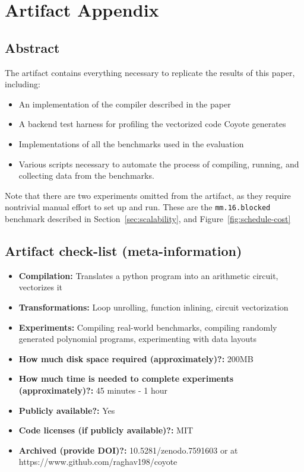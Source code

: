 \section{Artifact Appendix}

\subsection{Abstract}

The artifact contains everything necessary to replicate the results of this paper, including:
\begin{itemize}
    \item An implementation of the compiler described in the paper
    \item A backend test harness for profiling the vectorized code Coyote generates
    \item Implementations of all the benchmarks used in the evaluation
    \item Various scripts necessary to automate the process of compiling, running, and collecting data from the benchmarks.
\end{itemize}

Note that there are two experiments omitted from the artifact, as they require nontrivial manual effort to set up and run. These are the {\tt mm.16.blocked} benchmark described in Section~\ref{sec:scalability}, and Figure~\ref{fig:schedule-cost}

\subsection{Artifact check-list (meta-information)}

{\small
\begin{itemize}
  \item {\bf Compilation: } Translates a python program into an arithmetic circuit, vectorizes it
  \item {\bf Transformations: } Loop unrolling, function inlining, circuit vectorization
  \item {\bf Experiments: } Compiling real-world benchmarks, compiling randomly generated polynomial programs, experimenting with data layouts
  \item {\bf How much disk space required (approximately)?: } 200MB
  \item {\bf How much time is needed to complete experiments (approximately)?: } 45 minutes - 1 hour
  \item {\bf Publicly available?: } Yes
  \item {\bf Code licenses (if publicly available)?: } MIT
  \item {\bf Archived (provide DOI)?: } 10.5281/zenodo.7591603 or at https://www.github.com/raghav198/coyote
  
\end{itemize}
}

